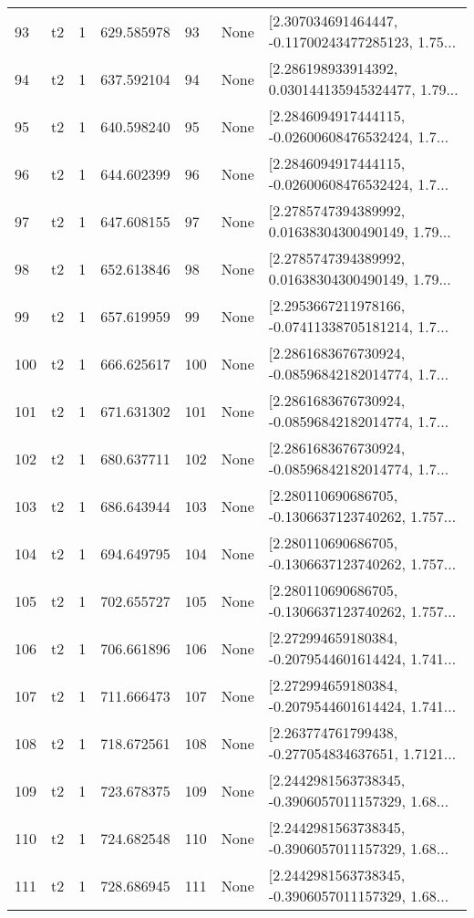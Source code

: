 \begin{tabular}{lllrlll}
93  &  t2 &   1 &   629.585978 &   93 &  None &  [2.307034691464447, -0.11700243477285123, 1.75... \\
94  &  t2 &   1 &   637.592104 &   94 &  None &  [2.286198933914392, 0.030144135945324477, 1.79... \\
95  &  t2 &   1 &   640.598240 &   95 &  None &  [2.2846094917444115, -0.02600608476532424, 1.7... \\
96  &  t2 &   1 &   644.602399 &   96 &  None &  [2.2846094917444115, -0.02600608476532424, 1.7... \\
97  &  t2 &   1 &   647.608155 &   97 &  None &  [2.2785747394389992, 0.01638304300490149, 1.79... \\
98  &  t2 &   1 &   652.613846 &   98 &  None &  [2.2785747394389992, 0.01638304300490149, 1.79... \\
99  &  t2 &   1 &   657.619959 &   99 &  None &  [2.2953667211978166, -0.07411338705181214, 1.7... \\
100 &  t2 &   1 &   666.625617 &  100 &  None &  [2.2861683676730924, -0.08596842182014774, 1.7... \\
101 &  t2 &   1 &   671.631302 &  101 &  None &  [2.2861683676730924, -0.08596842182014774, 1.7... \\
102 &  t2 &   1 &   680.637711 &  102 &  None &  [2.2861683676730924, -0.08596842182014774, 1.7... \\
103 &  t2 &   1 &   686.643944 &  103 &  None &  [2.280110690686705, -0.1306637123740262, 1.757... \\
104 &  t2 &   1 &   694.649795 &  104 &  None &  [2.280110690686705, -0.1306637123740262, 1.757... \\
105 &  t2 &   1 &   702.655727 &  105 &  None &  [2.280110690686705, -0.1306637123740262, 1.757... \\
106 &  t2 &   1 &   706.661896 &  106 &  None &  [2.272994659180384, -0.2079544601614424, 1.741... \\
107 &  t2 &   1 &   711.666473 &  107 &  None &  [2.272994659180384, -0.2079544601614424, 1.741... \\
108 &  t2 &   1 &   718.672561 &  108 &  None &  [2.263774761799438, -0.277054834637651, 1.7121... \\
109 &  t2 &   1 &   723.678375 &  109 &  None &  [2.2442981563738345, -0.3906057011157329, 1.68... \\
110 &  t2 &   1 &   724.682548 &  110 &  None &  [2.2442981563738345, -0.3906057011157329, 1.68... \\
111 &  t2 &   1 &   728.686945 &  111 &  None &  [2.2442981563738345, -0.3906057011157329, 1.68... \\

\end{tabular}
